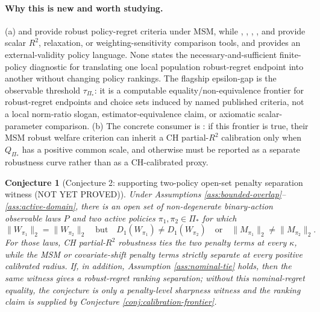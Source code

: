 \documentclass[11pt]{article}
\theoremstyle{definition}
\theoremstyle{plain}
\newtheorem{conjecture}{Conjecture}
\theoremstyle{remark}
\begin{document}
\paragraph{Why this is new and worth studying.}
(a) \citet{KallusZhou2021} and \citet{JinXuZhengZhou2025} provide robust policy-regret criteria under MSM, while \citet{CinelliHazlett2020}, \citet{DiegertMastenPoirier2025}, \citet{MastenPoirierRen2025}, \citet{SorianoBenMichaelBickelFellerPimentel2023}, and \citet{HuangPimentel2025} provide scalar $R^2$, relaxation, or weighting-sensitivity comparison tools, and \citet{AdjahoChristensen2025} provides an external-validity policy language.  None states the necessary-and-sufficient finite-policy diagnostic for translating one local population robust-regret endpoint into another without changing policy rankings.  The flagship epsilon-gap is the observable threshold $\tau_{\Pi_\ast}$: it is a computable equality/non-equivalence frontier for robust-regret endpoints and choice sets induced by named published criteria, not a local norm-ratio slogan, estimator-equivalence claim, or axiomatic scalar-parameter comparison.  (b) The concrete consumer is \citet{JinXuZhengZhou2025}: if this frontier is true, their MSM robust welfare criterion can inherit a CH partial-$R^2$ calibration only when $Q_{\Pi_\ast}$ has a positive common scale, and otherwise must be reported as a separate robustness curve rather than as a CH-calibrated proxy.

\begin{conjecture}[Conjecture 2: supporting two-policy open-set penalty separation witness (NOT YET PROVED)]\label{conj:open-set-witness}
Under Assumptions \ref{ass:bounded-overlap}--\ref{ass:active-domain}, there is an open set of non-degenerate binary-action observable laws $P$ and two active policies $\pi_1,\pi_2\in\Pi_\ast$ for which
\[
  \|W_{\pi_1}\|_2=\|W_{\pi_2}\|_2
  \quad\text{but}\quad
  D_1(W_{\pi_1})\ne D_1(W_{\pi_2})
  \quad\text{or}\quad
  \|M_{\pi_1}\|_2\ne\|M_{\pi_2}\|_2.
\]
For those laws, CH partial-$R^2$ robustness ties the two penalty terms at every $\kappa$, while the MSM or covariate-shift penalty terms strictly separate at every positive calibrated radius.  If, in addition, Assumption \ref{ass:nominal-tie} holds, then the same witness gives a robust-regret ranking separation; without this nominal-regret equality, the conjecture is only a penalty-level sharpness witness and the ranking claim is supplied by Conjecture \ref{conj:calibration-frontier}.
\end{conjecture}
\end{document}
